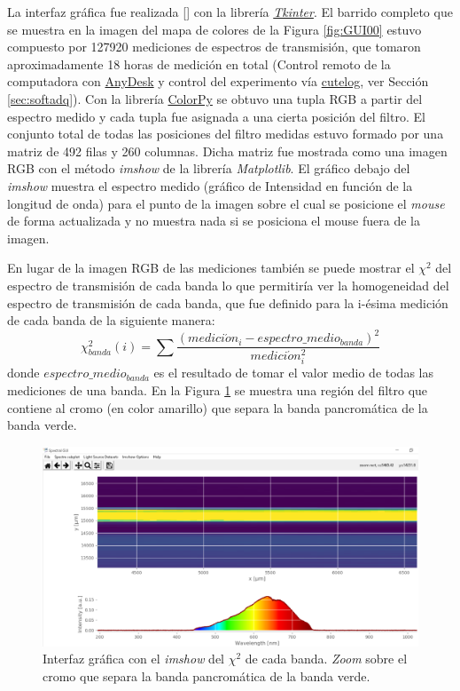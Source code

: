 La interfaz gráfica fue realizada [\href{https://github.com/jrr1984/Prototipo0\_S-D\_SpectralGUI/blob/master/spectral\_gui/main.py}{\faGithub}] con la librería	 \href{https://wiki.python.org/moin/TkInter}{\textit{Tkinter}}. El barrido completo que se muestra en la imagen del mapa de colores de la Figura \ref{fig:GUI00} estuvo compuesto por 127920 mediciones de espectros de transmisión, que tomaron aproximadamente 18 horas de medición en total (Control remoto de la computadora con \href{https://anydesk.com/es}{AnyDesk} y control del experimento vía \href{https://pypi.org/project/cutelog/}{cutelog}, ver Sección \ref{sec:softadq}). Con la librería \href{https://pypi.org/project/colorpy/}{ColorPy} se obtuvo una tupla RGB a partir del espectro medido y cada tupla fue asignada a una cierta posición del filtro. El conjunto total de todas las posiciones del filtro medidas estuvo formado por una matriz de 492 filas y 260 columnas. Dicha matriz fue mostrada como una imagen RGB con el método \textit{imshow} de la librería \textit{Matplotlib}. El gráfico debajo del \textit{imshow} muestra el espectro medido (gráfico de Intensidad en función de la longitud de onda) para el punto de la imagen sobre el cual se posicione el \textit{mouse} de forma actualizada y no muestra nada si se posiciona el mouse fuera de la imagen. 

En lugar de la imagen RGB de las mediciones también se puede mostrar el $\chi^{2}$ del espectro de transmisión de cada banda lo que permitiría ver la homogeneidad del espectro de transmisión de cada banda, que fue definido para la i-ésima medición de cada banda de la siguiente manera:
\begin{equation}
\chi^{2}_{banda}(i) = \sum \frac{(medici\acute{o}n_{i} - espectro\_medio_{banda})^{2}}{medici\acute{o}n^{2}_{i}}
\end{equation}
donde $espectro\_medio_{banda}$ es el resultado de tomar el valor medio de todas las mediciones de una banda. En la Figura \ref{fig:GUI01} se muestra una región del filtro que contiene al cromo (en color amarillo) que separa la banda pancromática de la banda verde.
\begin{figure}[H]
	\centering
	\includegraphics[width=1.0\textwidth]{Figs/microespectrometro/chidisp.png}
	\caption{Interfaz gráfica con el \textit{imshow} del $\chi^{2}$ de cada banda. \textit{Zoom} sobre el cromo que separa la banda pancromática de la banda verde.}
	\label{fig:GUI01}
\end{figure}

